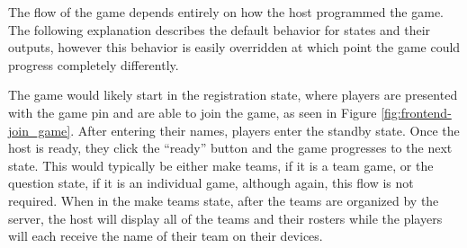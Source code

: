 \documentclass{article}
\begin{document}
            The flow of the game depends entirely on how the host programmed the game. The following explanation describes the default behavior for states and their outputs, however this behavior is easily overridden at which point the game could progress completely differently.
            \smallskip
            
            The game would likely start in the registration state, where players are presented with the game pin and are able to join the game, as seen in Figure \ref{fig:frontend-join_game}. After entering their names, players enter the standby state. Once the host is ready, they click the ``ready'' button and the game progresses to the next state. This would typically be either make teams, if it is a team game, or the question state, if it is an individual game, although again, this flow is not required. When in the make teams state, after the teams are organized by the server, the host will display all of the teams and their rosters while the players will each receive the name of their team on their devices. 
\end{document}
